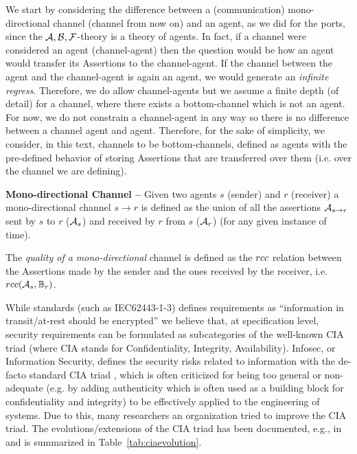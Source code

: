 We start by considering the difference between a (communication)
mono-directional channel (channel from now on) and an agent, as we did for the
ports, since the $\mathcal{A},\mathcal{B},\mathcal{F}$-theory is a theory of agents.  In fact, if a channel
were considered an agent (channel-agent) then the question would be how an
agent would transfer its Assertions to the channel-agent. If the channel
between the agent and the channel-agent is again an agent, we would generate an
\emph{infinite regress}. Therefore, we do allow channel-agents but we assume
a finite depth (of detail) for a channel, where there exists a bottom-channel 
which is not an agent. For now, we do not constrain a channel-agent in any way
so there is no difference between a channel agent and agent. Therefore, for
the sake of simplicity, we consider, in this text, channels to be bottom-channels,
defined as agents with the pre-defined behavior of storing Assertions that are transferred
over them (i.e. over the channel we are defining).

\begin{definition}{\bf Mono-directional Channel --}\label{def:monochannel}
	Given two agents $s$ (sender) and $r$ (receiver) a
	mono-directional channel $s \rightarrow r$ is defined as the union of all the assertions 
	$\rassert{s}{r}$ sent by $s$ to $r$ ($\mathcal{A}_s$) and received by $r$ from $s$ ($\mathcal{A}_r$) (for any given instance of time). 
\end{definition}
The \emph{quality of a mono-directional} channel is defined as the 
$rcc$ relation between the Assertions made by the sender and the ones received by the receiver, i.e. $rcc(\mathcal{A}_s,\mathbb{B}_r)$.


While standards (such
as IEC62443-1-3) defines requirements as
``information in transit/at-rest should be encrypted'' we believe that, at
specification level, security requirements can be formulated as subcategories of
the well-known CIA triad (where CIA stands for Confidentiality, Integrity,
Availability).
Infosec, or Information Security, defines the security risks related to
information with the de-facto standard CIA triad , which is often criticized
\autocite{CIAcriticismCPS} for being too general or non-adequate (e.g. by
adding authenticity which is often used as a building block for confidentiality
and integrity) to be effectively applied to the engineering of systems. Due to
this, many researchers an organization tried to improve the CIA triad.  The
evolutions/extensions of the CIA triad has been documented, e.g., in
\autocite{Samonas2014cia} and is summarized in Table~\ref{tab:ciaevolution}.

